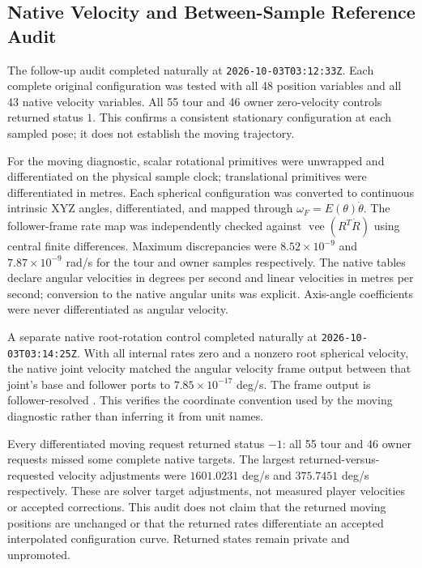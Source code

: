 \documentclass[11pt,a4paper]{article}
\begin{document}
\subsection{Native Velocity and Between-Sample Reference Audit}
\label{sec:velocity-midpoint-audit}
The follow-up audit completed naturally at
\texttt{2026-10-03T03:12:33Z}. Each complete original configuration was
tested with all 48 position variables and all 43 native velocity variables.
All 55 tour and 46 owner zero-velocity controls returned status $1$.
This confirms a consistent stationary configuration at each sampled pose;
it does not establish the moving trajectory.

For the moving diagnostic, scalar rotational primitives were unwrapped
and differentiated on the physical sample clock; translational primitives
were differentiated in metres. Each spherical configuration was converted
to continuous intrinsic XYZ angles, differentiated, and mapped through
$\omega_F=E(\theta)\dot\theta$. The follower-frame rate map was independently
checked against $\operatorname{vee}(R^T\dot R)$ using central finite
differences. Maximum discrepancies were $8.52\times10^{-9}$ and
$7.87\times10^{-9}$ rad/s for the tour and owner samples respectively.
The native tables declare angular velocities in degrees per second and
linear velocities in metres per second; conversion to the native angular
units was explicit. Axis-angle coefficients were never differentiated as
angular velocity.

A separate native root-rotation control completed naturally at
\texttt{2026-10-03T03:14:25Z}. With all internal rates zero and a nonzero
root spherical velocity, the native joint velocity matched the angular
velocity frame output between that joint's base and follower ports to
$7.85\times10^{-17}$ deg/s. The frame output is follower-resolved
\cite{MathWorksFrameVelocity}. This verifies the coordinate convention
used by the moving diagnostic rather than inferring it from unit names.

Every differentiated moving request returned status $-1$: all 55 tour and
46 owner requests missed some complete native targets. The largest
returned-versus-requested velocity adjustments were $1601.0231$ deg/s and
$375.7451$ deg/s respectively. These are solver target adjustments, not
measured player velocities or accepted corrections. This audit does not
claim that the returned moving positions are unchanged or that the
returned rates differentiate an accepted interpolated configuration curve.
Returned states remain private and unpromoted.
\end{document}
